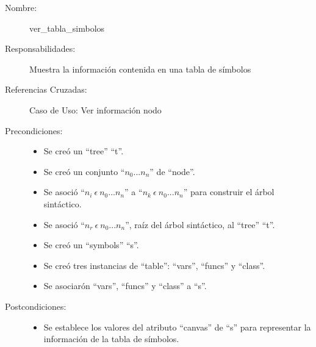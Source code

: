 	\begin{description}
		\item [Nombre:] ver\_tabla\_simbolos
		\item [Responsabilidades:] Muestra la información contenida en una tabla de símbolos
		\item [Referencias Cruzadas: ] Caso de Uso: Ver información nodo
      \item [Precondiciones:] \hfill
         \begin {itemize}
         \item Se creó un ``tree'' ``t''.
         \item Se creó un conjunto ``$n_0...n_n$'' de ``node''.
         \item Se asoció ``$n_i\ \epsilon\ n_0...n_n$'' a ``$n_k\ \epsilon\ n_0...n_n$'' para construir el árbol sintáctico.
         \item Se asoció  ``$n_r\ \epsilon\ n_0...n_n$'', raíz del árbol sintáctico, al ``tree'' ``t''.
         \item Se creó un ``symbols'' ``s''.
         \item Se creó tres instancias de ``table'': ``vars'', ``funcs'' y ``class''.
         \item Se asociarón ``vars'', ``funcs'' y ``class'' a ``s''.
      \end{itemize}
      \item [Postcondiciones:] \hfill
      \begin {itemize}
         \item Se establece los valores del atributo ``canvas'' de ``s'' para representar la información de la tabla de símbolos.
      \end{itemize}
	\end{description} 



